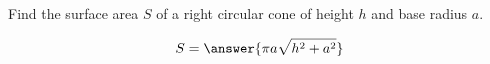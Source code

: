 \documentclass{ximera}
\author{David Guichard \and Neal Koblitz \and H. Jerome Keisler \and Albert Scheller \and Barry Balof \and Mike Wills \and Matthew Carr}
\begin{document}
\begin{exercise}





Find the surface area $S$ of a right circular cone of height $h$ and base radius $a$.
\begin{prompt}
\[
S=\answer{\pi a \sqrt{h^2+a^2}}
\]
\end{prompt}



\end{exercise}
\end{document}
